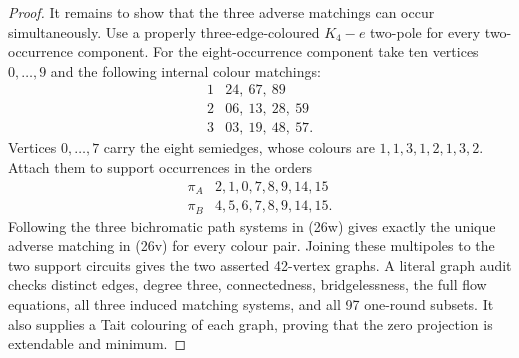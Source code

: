 \documentclass[11pt]{article}
\theoremstyle{definition}
\theoremstyle{remark}
\begin{document}
\begin{proof}
It remains to show that the three adverse matchings can occur
simultaneously.  Use a properly three-edge-coloured \(K_4-e\) two-pole for
every two-occurrence component.  For the eight-occurrence component take
ten vertices \(0,\ldots,9\) and the following internal colour matchings:
\[
\begin{array}{c|l}
1&24,\ 67,\ 89\\
2&06,\ 13,\ 28,\ 59\\
3&03,\ 19,\ 48,\ 57 .
\end{array}                                                \tag{26w}
\]
Vertices \(0,\ldots,7\) carry the eight semiedges, whose colours are
\(1,1,3,1,2,1,3,2\).  Attach them to support occurrences in the orders
\[
\begin{array}{c|l}
\pi_A&2,1,0,7,8,9,14,15\\
\pi_B&4,5,6,7,8,9,14,15 .
\end{array}                                                \tag{26x}
\]
Following the three bichromatic path systems in (26w) gives exactly the
unique adverse matching in (26v) for every colour pair.  Joining these
multipoles to the two support circuits gives the two asserted
42-vertex graphs.  A literal graph audit checks distinct edges,
degree three, connectedness, bridgelessness, the full flow equations,
all three induced matching systems, and all 97 one-round subsets.
It also supplies a Tait colouring of each graph, proving that the zero
projection is extendable and minimum.
\end{proof}
\end{document}
